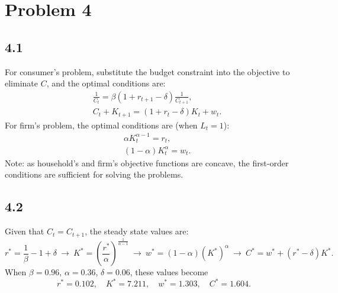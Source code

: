 \documentclass[11pt]{article}
\newcommand{\alp}{\ensuremath{\alpha}}
\newcommand{\bet}{\ensuremath{\beta}}
\begin{document}
\section*{Problem 4}

\subsection*{4.1}

For consumer's problem, substitute the budget constraint into the objective to eliminate $C$, and the optimal conditions are:
\begin{align}
& \frac{1}{C_t} = \bet (1 + r_{t+1} - \delta) \frac{1}{C_{t+1}}, \\
& C_t + K_{t+1} = (1 + r_t - \delta) K_t + w_t.
\end{align}
For firm's problem, the optimal conditions are (when $L_t = 1$):
\begin{align}
& \alp K_t^{\alp-1} = r_t, \\
& (1-\alp) K_t^\alp = w_t.
\end{align}
Note: as household's and firm's objective functions are concave, the first-order conditions are sufficient for solving the problems.

\subsection*{4.2}
Given that $C_t = C_{t+1}$, the steady state values are: $$ r^* = \frac{1}{\bet} - 1 + \delta \ \rightarrow \ K^* = (\frac{r^*}{\alp})^{\frac{1}{\alp-1}}\ \rightarrow \ w^* = (1-\alp) (K^*)^\alp\ \rightarrow \ C^* = w^* + (r^* - \delta)K^*. $$ When $\bet = 0.96$, $\alp = 0.36$, $\delta = 0.06$, these values become $$ r^* = 0.102, \quad K^* = 7.211, \quad w^* = 1.303, \quad C^* = 1.604. $$
\end{document}
